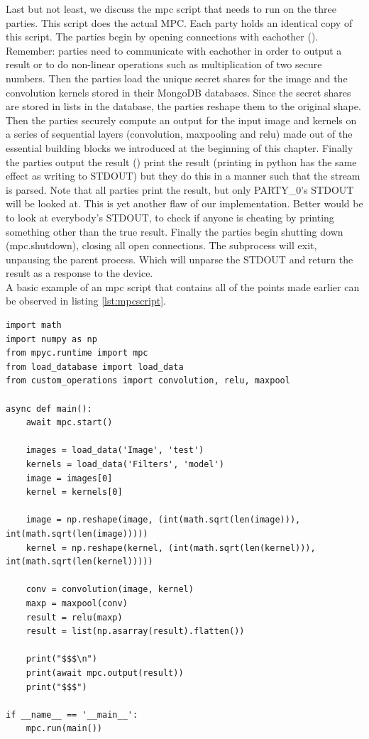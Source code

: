 Last but not least, we discuss the mpc script that needs to run on the three parties. This script does the actual MPC. Each party holds an identical copy of this script. The parties begin by opening connections with eachother (). Remember: parties need to communicate with eachother in order to output a result or to do non-linear operations such as multiplication of two secure numbers. Then the parties load the unique secret shares for the image and the convolution kernels stored in their MongoDB databases. Since the secret shares are stored in lists in the database, the parties reshape them to the original shape. Then the parties securely compute an output for the input image and kernels on a series of sequential layers (convolution, maxpooling and relu) made out of the essential building blocks we introduced at the beginning of this chapter. Finally the parties output the result () print the result (printing in python has the same effect as writing to STDOUT) but they do this in a manner such that the stream is parsed. Note that all parties print the result, but only PARTY\_0's STDOUT will be looked at. This is yet another flaw of our implementation. Better would be to look at everybody's STDOUT, to check if anyone is cheating by printing something other than the true result. Finally the parties begin shutting down (mpc.shutdown), closing all open connections. The subprocess will exit, unpausing the parent process. Which will unparse the STDOUT and return the result as a response to the device.\\

 A basic example of an mpc script that contains all of the points made earlier can be observed in listing \ref{lst:mpcscript}.

\begin{lstlisting}[caption={Example of MPC script for a single CNN layer (conv,maxp and relu)}, label={lst:mpcscript}, frame=single, breaklines=true]
import math
import numpy as np
from mpyc.runtime import mpc
from load_database import load_data
from custom_operations import convolution, relu, maxpool

async def main():
    await mpc.start()

    images = load_data('Image', 'test')
    kernels = load_data('Filters', 'model')
    image = images[0]
    kernel = kernels[0]

    image = np.reshape(image, (int(math.sqrt(len(image))), int(math.sqrt(len(image)))))
    kernel = np.reshape(kernel, (int(math.sqrt(len(kernel))), int(math.sqrt(len(kernel)))))

    conv = convolution(image, kernel)
    maxp = maxpool(conv)
    result = relu(maxp)
    result = list(np.asarray(result).flatten())

    print("$$$\n")
    print(await mpc.output(result))
    print("$$$")

if __name__ == '__main__':
    mpc.run(main())
\end{lstlisting}

